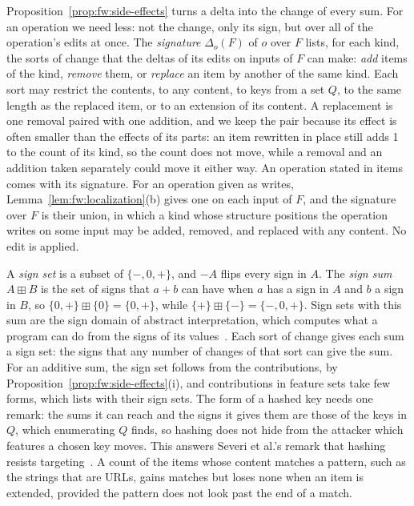 Proposition~\ref{prop:fw:side-effects} turns a delta into the change of every sum. For an operation we need less: not
the change, only its sign, but over all of the operation's edits at once. The \emph{signature} $\Delta_o(F)$ of $o$
over $F$ lists, for each kind, the sorts of change that the deltas of its edits on inputs of $F$ can make: \emph{add}
items of the kind, \emph{remove} them, or \emph{replace} an item by another of the same kind. Each sort may restrict
the contents, to any content, to keys from a set $Q$, to the same length as the replaced item, or to an extension of
its content. A replacement is one removal paired with one addition, and we keep the pair because its effect is often
smaller than the effects of its parts: an item rewritten in place still adds 1 to the count of its kind, so the count
does not move, while a removal and an addition taken separately could move it either way. An operation stated in
items comes with its signature. For an operation given as writes, Lemma~\ref{lem:fw:localization}(b) gives one on each
input of $F$, and the signature over $F$ is their union, in which a kind whose structure positions the operation
writes on some input may be added, removed, and replaced with any content. No edit is applied.

A \emph{sign set} is a subset of $\{-, 0, +\}$, and $-A$ flips every sign in $A$. The \emph{sign sum} $A \boxplus B$
is the set of signs that $a + b$ can have when $a$ has a sign in $A$ and $b$ a sign in $B$, so
$\{0, +\} \boxplus \{0\} = \{0, +\}$, while $\{+\} \boxplus \{-\} = \{-, 0, +\}$. Sign sets with this sum are the sign
domain of abstract interpretation, which computes what a program can do from the signs of its
values~\cite{cousot1977abstract}. Each sort of change gives each sum a sign set: the signs that any number of changes of
that sort can give the sum. For an additive sum, the sign set follows from the contributions, by
Proposition~\ref{prop:fw:side-effects}(i), and contributions in feature sets take few forms, which
 lists with their sign sets. The form of a hashed key needs one remark: the sums it can reach and
the signs it gives them are those of the keys in $Q$, which enumerating $Q$ finds, so hashing does not hide from the
attacker which features a chosen key moves. This answers Severi et al.'s remark that hashing resists
targeting~\cite{severi2021explanation}. A count of the items whose content matches a pattern, such as the strings
that are URLs, gains matches but loses none when an item is extended, provided the pattern does not look past the end
of a match.

